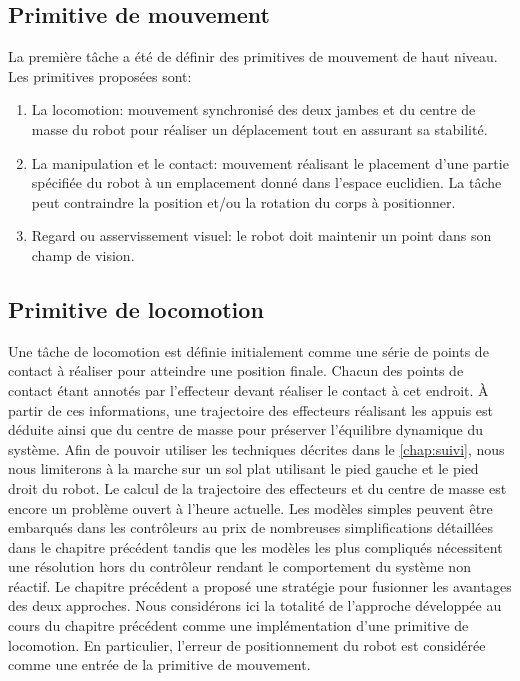 \subsection{Primitive de mouvement}

La première tâche a été de définir des primitives de mouvement de
haut niveau. Les primitives proposées sont:
\begin{enumerate}
\item La locomotion: mouvement synchronisé des deux jambes et du
  centre de masse du robot pour réaliser un déplacement tout en
  assurant sa stabilité.
\item La manipulation et le contact: mouvement réalisant le placement
  d'une partie spécifiée du robot à un emplacement donné dans l'espace
  euclidien. La tâche peut contraindre la position et/ou la rotation
  du corps à positionner.
\item Regard ou asservissement visuel: le robot doit maintenir un
  point dans son champ de vision.
\end{enumerate}


\subsection{Primitive de locomotion}

Une tâche de locomotion est définie initialement comme une série de
points de contact à réaliser pour atteindre une position
finale. Chacun des points de contact étant annotés par l'effecteur
devant réaliser le contact à cet endroit. À partir de ces
informations, une trajectoire des effecteurs réalisant les appuis est
déduite ainsi que du centre de masse pour préserver l'équilibre
dynamique du système. Afin de pouvoir utiliser les techniques décrites
dans le \autoref{chap:suivi}, nous nous limiterons à la marche sur un
sol plat utilisant le pied gauche et le pied droit du robot. Le calcul
de la trajectoire des effecteurs et du centre de masse est encore un
problème ouvert à l'heure actuelle. Les modèles simples peuvent être
embarqués dans les contrôleurs au prix de nombreuses simplifications
détaillées dans le chapitre précédent tandis que les modèles les plus
compliqués nécessitent une résolution hors du contrôleur rendant le
comportement du système non réactif. Le chapitre précédent a proposé
une stratégie pour fusionner les avantages des deux approches. Nous
considérons ici la totalité de l'approche développée au cours du
chapitre précédent comme une implémentation d'une primitive de
locomotion. En particulier, l'erreur de positionnement du robot est
considérée comme une entrée de la primitive de mouvement.


